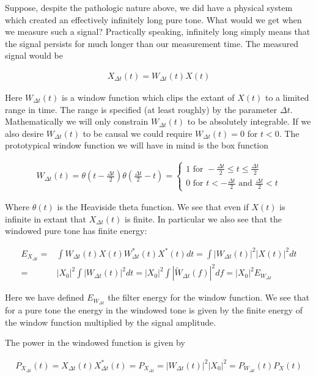 \documentclass[12pt]{article}
\begin{document}
Suppose, despite the pathologic nature above, we did have a physical system which created an effectively infinitely long pure tone.
What would we get when we measure such a signal?
Practically speaking, infinitely long simply means that the signal persists for much longer than our measurement time.
The measured signal would be

\begin{align}
X_{\Delta t}(t) = W_{\Delta t}(t) X(t)
\end{align}

Here $W_{\Delta t}(t)$ is a window function which clips the extant of $X(t)$ to a limited range in time.
The range is specified (at least roughly) by the parameter $\Delta t$.
Mathematically we will only constrain $W_{\Delta t}(t)$ to be absolutely integrable. 
If we also desire $W_{\Delta t}(t)$ to be causal we could require $W_{\Delta t}(t) = 0$ for $t < 0$.
The prototypical window function we will have in mind is the box function

\begin{align}
W_{\Delta t}(t) = \theta\left(t-\frac{\Delta t}{2}\right)\theta\left(\frac{\Delta t}{2} - t\right) = 
\begin{cases}
1 \text{ for } -\frac{\Delta t}{2} \le t \le \frac{\Delta t}{2}\\
0 \text{ for } t < -\frac{\Delta t}{2} \text{ and } \frac{\Delta t}{2} < t
\end{cases}
\end{align}

Where $\theta(t)$ is the Heaviside theta function.
We see that even if $X(t)$ is infinite in extant that $X_{\Delta t}(t)$ is finite.
In particular we also see that the windowed pure tone has finite energy:

\begin{align}
E_{X_{\Delta t}} =& \int W_{\Delta t}(t)X(t) W_{\Delta t}^*(t) X^*(t) dt = \int |W_{\Delta t}(t)|^2|X(t)|^2 dt\\
=& |X_0|^2\int |W_{\Delta t}(t)|^2 dt = |X_0|^2\int |\tilde{W}_{\Delta t}(f)|^2 df = |X_0|^2 E_{W_{\Delta t}}
\end{align}

Here we have defined $E_{W_{\Delta t}}$ the filter energy for the window function.
We see that for a pure tone the energy in the windowed tone is given by the finite energy of the window function multiplied by the signal amplitude.
 
The power in the windowed function is given by
 
\begin{align}
P_{X_{\Delta t}}(t) = X_{\Delta t}(t)X_{\Delta t}^*(t) = P_{X_{\Delta t}} = |W_{\Delta t}(t)|^2 |X_0|^2 = P_{W_{\Delta t}}(t) P_X(t)
\end{align}
 
\end{document}
